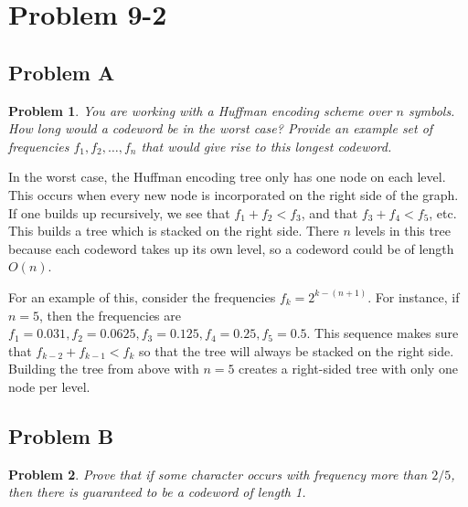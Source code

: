 \documentclass[psamsfonts]{amsart}
\newtheorem{prob}{Problem}[section]
\newenvironment{sol}{{\bfseries Solution}}{\qedsymbol}
\theoremstyle{definition}
\theoremstyle{remark}
\numberwithin{equation}{section}
\begin{document}
\section{Problem 9-2}

\subsection{Problem A}

\begin{prob}
You are working with a Huffman encoding scheme over $n$ symbols. How long would a codeword be in the worst case? Provide an example set of frequencies $f_1, f_2, \ldots, f_n$ that would give rise to this longest codeword.
\end{prob}

\begin{sol}
In the worst case, the Huffman encoding tree only has one node on each level. This occurs when every new node is incorporated on the right side of the graph. If one builds up recursively, we see that $f_1 + f_2 < f_3$, and that $f_3 + f_4 < f_5$, etc. This builds a tree which is stacked on the right side. There $n$ levels in this tree because each codeword takes up its own level, so a codeword could be of length $O(n)$. 

For an example of this, consider the frequencies $f_k = 2^{k - (n+1)}$. For instance, if $n =5$, then the frequencies are $f_1 = 0.031, f_2 = 0.0625, f_3 = 0.125, f_4 = 0.25, f_5 = 0.5$. This sequence makes sure that $f_{k-2} + f_{k-1} < f_k$ so that the tree will always be stacked on the right side. Building the tree from above with $n = 5$ creates a right-sided tree with only one node per level. 
\end{sol}

\subsection{Problem B}

\begin{prob}
Prove that if some character occurs with frequency more than $2/5$, then there is guaranteed to be a codeword of length 1. 
\end{prob}
\end{document}
